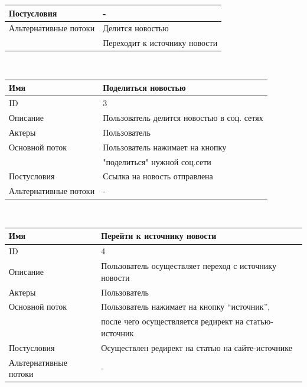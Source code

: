 \begin{center}
\begin{tabular}{|l|l|}
        \hline
        Постусловия           & -                                            \\
        \hline
        Альтернативные потоки & Делится новостью                             \\
        & Переходит к источнику новости                \\
        \hline
    \end{tabular}\\
    \vspace{0.5cm}
    \begin{tabular}{|l|l|}
        \hline
        Имя                   & Поделиться новостью                        \\
        \hline
        ID                    & 3                                          \\
        \hline
        Описание              & Пользователь делится новостью в соц. сетях \\
        \hline
        Актеры                & Пользователь                               \\
        \hline
        Основной поток        & Пользователь нажимает на кнопку            \\
        & "поделиться" нужной соц.сети               \\
        \hline
        Постусловия           & Ссылка на новость отправлена               \\
        \hline
        Альтернативные потоки & -                                          \\
        \hline
    \end{tabular}\\
    \vspace{0.8cm}
    \begin{tabular}{|l|l|}
        \hline
        Имя                   & Перейти к источнику новости                           \\
        \hline
        ID                    & 4                                                     \\
        \hline
        Описание              & Пользователь осуществляет переход с источнику новости \\
        \hline
        Актеры                & Пользователь                                          \\
        \hline
        Основной поток        & Пользователь нажимает на кнопку “источник”,           \\
        & после чего осуществляется редирект на статью-источник \\
        \hline
        Постусловия           & Осуществлен редирект на статью на сайте-источнике     \\
        \hline
        Альтернативные потоки & -                                                     \\
        \hline
    \end{tabular}\\
\end{center}
